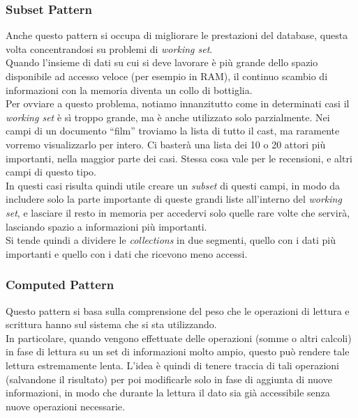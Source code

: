 \subsubsection{Subset Pattern}
Anche questo pattern si occupa di migliorare le prestazioni del database, questa volta concentrandosi su problemi di \textit{working set}.\\
Quando l'insieme di dati su cui si deve lavorare è più grande dello spazio disponibile ad accesso veloce (per esempio in RAM), il continuo scambio di informazioni con la memoria diventa un collo di bottiglia.\\
Per ovviare a questo problema, notiamo innanzitutto come in determinati casi il \textit{working set} è sì troppo grande, ma è anche utilizzato solo parzialmente. Nei campi di un documento ``film'' troviamo la lista di tutto il cast, ma raramente vorremo visualizzarlo per intero. Ci basterà una lista dei 10 o 20 attori più importanti, nella maggior parte dei casi. Stessa cosa vale per le recensioni, e altri campi di questo tipo.\\
In questi casi risulta quindi utile creare un \textit{subset} di questi campi, in modo da includere solo la parte importante di queste grandi liste all'interno del \textit{working set}, e lasciare il resto in memoria per accedervi solo quelle rare volte che servirà, lasciando spazio a informazioni più importanti.\\
Si tende quindi a dividere le \textit{collections} in due segmenti, quello con i dati più importanti e quello con i dati che ricevono meno accessi.\\

\subsubsection{Computed Pattern}
Questo pattern si basa sulla comprensione del peso che le operazioni di lettura e scrittura hanno sul sistema che si sta utilizzando.\\
In particolare, quando vengono effettuate delle operazioni (somme o altri calcoli) in fase di lettura su un set di informazioni molto ampio, questo può rendere tale lettura estremamente lenta. L'idea è quindi di tenere traccia di tali operazioni (salvandone il risultato) per poi modificarle solo in fase di aggiunta di nuove informazioni, in modo che durante la lettura il dato sia già accessibile senza nuove operazioni necessarie.\\

